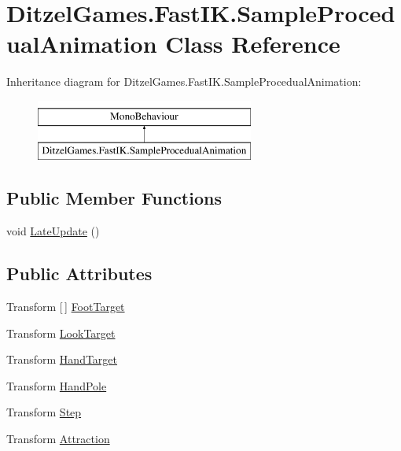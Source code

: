 \hypertarget{class_ditzel_games_1_1_fast_i_k_1_1_sample_procedual_animation}{}\section{Ditzel\+Games.\+Fast\+I\+K.\+Sample\+Procedual\+Animation Class Reference}
\label{class_ditzel_games_1_1_fast_i_k_1_1_sample_procedual_animation}
Inheritance diagram for Ditzel\+Games.\+Fast\+I\+K.\+Sample\+Procedual\+Animation\+:\begin{figure}[H]
\begin{center}
\leavevmode
\includegraphics[height=2.000000cm]{class_ditzel_games_1_1_fast_i_k_1_1_sample_procedual_animation}
\end{center}
\end{figure}
\subsection*{Public Member Functions}
\begin{DoxyCompactItemize}
\item 
void \mbox{\hyperlink{class_ditzel_games_1_1_fast_i_k_1_1_sample_procedual_animation_a1e5f3d7f3462ce0a079a844d5091faf2}{Late\+Update}} ()
\end{DoxyCompactItemize}
\subsection*{Public Attributes}
\begin{DoxyCompactItemize}
\item 
Transform \mbox{[}$\,$\mbox{]} \mbox{\hyperlink{class_ditzel_games_1_1_fast_i_k_1_1_sample_procedual_animation_aa83fe353b8a5018c73b83017683bfa30}{Foot\+Target}}
\item 
Transform \mbox{\hyperlink{class_ditzel_games_1_1_fast_i_k_1_1_sample_procedual_animation_a769131f4c7aafd4ff7b4969fea0ba10f}{Look\+Target}}
\item 
Transform \mbox{\hyperlink{class_ditzel_games_1_1_fast_i_k_1_1_sample_procedual_animation_a27b8f569d2b291c9f865e2dfe27b99af}{Hand\+Target}}
\item 
Transform \mbox{\hyperlink{class_ditzel_games_1_1_fast_i_k_1_1_sample_procedual_animation_a221ae67515a91421ed818821cf66090d}{Hand\+Pole}}
\item 
Transform \mbox{\hyperlink{class_ditzel_games_1_1_fast_i_k_1_1_sample_procedual_animation_a9f970cdab7b83239effe8eb63c3a375c}{Step}}
\item 
Transform \mbox{\hyperlink{class_ditzel_games_1_1_fast_i_k_1_1_sample_procedual_animation_ab38691eef83f8493c90cf92fd6aafe77}{Attraction}}
\end{DoxyCompactItemize}


